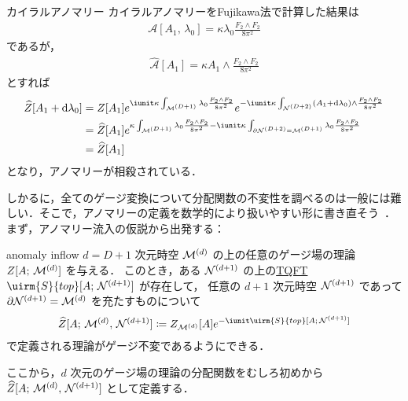 \documentclass[TQFT_main]{subfiles}
\begin{document}
\begin{myexample}[label=ex:chiral-anomaly]{カイラルアノマリー}
    カイラルアノマリーをFujikawa法で計算した結果は
    \begin{align}
        \mathcal{A}[A_1,\, \lambda_0] = \kappa \lambda_0 \frac{F_2 \wedge F_2}{8\pi^2}
    \end{align}
    であるが，
    \begin{align}
        \widehat{\mathcal{A}}[A_1] = \kappa A_1 \wedge \frac{F_2 \wedge F_2}{8\pi^2}
    \end{align}
    とすれば
    \begin{align}
        \widehat{Z}[A_1+\dd{\lambda_0}]
        &= Z[A_1] e^{\iunit \kappa \int_{\mfdcal{M}{D+1}} \lambda_0 \frac{F_2 \wedge F_2}{8\pi^2}} e^{- \iunit \kappa \int_{\mfdcal{N}{D+2}} (A_1 + \dd{\lambda_0}) \wedge \frac{F_2 \wedge F_2}{8\pi^2}} \\
        &= \widehat{Z}[A_1] e^{\kappa \int_{\mfdcal{M}{D+1}} \lambda_0 \frac{F_2 \wedge F_2}{8\pi^2}-\iunit \kappa \int_{\partial \mfdcal{N}{D+2} = \mfdcal{M}{D+1}} \lambda_0 \frac{F_2 \wedge F_2}{8\pi^2}} \\
        &= \widehat{Z}[A_1]
    \end{align}
    となり，アノマリーが相殺されている．
\end{myexample}

しかるに，全てのゲージ変換について分配関数の不変性を調べるのは一般には難しい．そこで，アノマリーの定義を数学的により扱いやすい形に書き直そう~\cite[p.41]{Kawahira2024anomaly}．まず，アノマリー流入の仮説から出発する：
\begin{myhypo}[label=hypo:anomaly-inflow]{anomaly inflow}
    $d = D+1$ 次元時空 $\mathcal{M}^{(d)}$ の上の任意のゲージ場の理論 $Z[A;\, \mathcal{M}^{(d)}]$ を与える．
    このとき，ある $\mathcal{N}^{(d+1)}$ の上の\hyperref[def:TQFT]{TQFT} $\uirm{S}{top}[A;\, \mfdcal{N}{d+1}]$ が存在して，
    任意の $d+1$ 次元時空 $\mathcal{N}^{(d+1)}$ であって $\partial \mathcal{N}^{(d+1)} = \mathcal{M}^{(d)}$ を充たすものについて
    \begin{align}
        \widehat{Z}[A;\, \mfdcal{M}{d},\, \mfdcal{N}{d+1}] \coloneqq Z_{\mfdcal{M}{d}}[A] e^{-\iunit \uirm{S}{top}[A;\, \mfdcal{N}{d+1}]}
    \end{align}
    で定義される理論がゲージ不変であるようにできる．
\end{myhypo}

ここから，$d$ 次元のゲージ場の理論の分配関数をむしろ初めから $\widehat{Z}[A;\, \mathcal{M}^{(d)},\, \mathcal{N}^{(d+1)}]$ として定義する．
\end{document}
